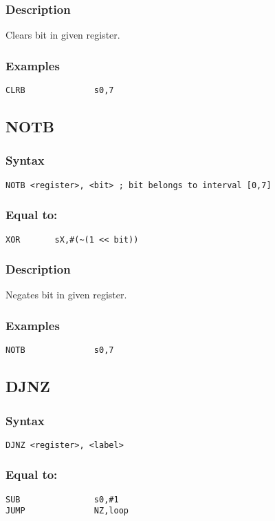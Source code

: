         \subsubsection{Description}
            Clears bit in given register.

        \subsubsection{Examples}
            \verb'CLRB              s0,7'

    \subsection{NOTB}
        \subsubsection{Syntax}
            \verb'NOTB <register>, <bit> ; bit belongs to interval [0,7]'

        \subsubsection{Equal to:}
            \verb'XOR       sX,#(~(1 << bit))'

        \subsubsection{Description}
            Negates bit in given register.

        \subsubsection{Examples}
            \verb'NOTB              s0,7'

    \subsection{DJNZ}
        \subsubsection{Syntax}
            \verb'DJNZ <register>, <label>'

        \subsubsection{Equal to:}
            \verb'SUB               s0,#1'\\
            \verb'JUMP              NZ,loop'

